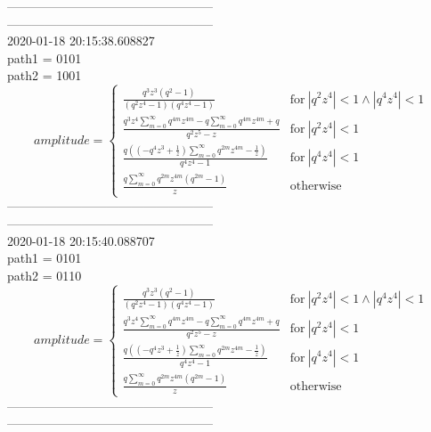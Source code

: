 \documentclass{jsreport}
\begin{document}
--------------------------------------------------\\
--------------------------------------------------\\
2020-01-18 20:15:38.608827\\
path1 = 0101\\
path2 = 1001\\
$$amplitude = \begin{cases} \frac{q^{3} z^{3} \left(q^{2} - 1\right)}{\left(q^{2} z^{4} - 1\right) \left(q^{4} z^{4} - 1\right)} & \text{for}\: \left|{q^{2} z^{4}}\right| < 1 \wedge \left|{q^{4} z^{4}}\right| < 1 \\\frac{q^{3} z^{4} \sum_{m=0}^{\infty} q^{4 m} z^{4 m} - q \sum_{m=0}^{\infty} q^{4 m} z^{4 m} + q}{q^{2} z^{5} - z} & \text{for}\: \left|{q^{2} z^{4}}\right| < 1 \\\frac{q \left(\left(- q^{4} z^{3} + \frac{1}{z}\right) \sum_{m=0}^{\infty} q^{2 m} z^{4 m} - \frac{1}{z}\right)}{q^{4} z^{4} - 1} & \text{for}\: \left|{q^{4} z^{4}}\right| < 1 \\\frac{q \sum_{m=0}^{\infty} q^{2 m} z^{4 m} \left(q^{2 m} - 1\right)}{z} & \text{otherwise} \end{cases}$$
--------------------------------------------------\\
--------------------------------------------------\\
2020-01-18 20:15:40.088707\\
path1 = 0101\\
path2 = 0110\\
$$amplitude = \begin{cases} \frac{q^{3} z^{3} \left(q^{2} - 1\right)}{\left(q^{2} z^{4} - 1\right) \left(q^{4} z^{4} - 1\right)} & \text{for}\: \left|{q^{2} z^{4}}\right| < 1 \wedge \left|{q^{4} z^{4}}\right| < 1 \\\frac{q^{3} z^{4} \sum_{m=0}^{\infty} q^{4 m} z^{4 m} - q \sum_{m=0}^{\infty} q^{4 m} z^{4 m} + q}{q^{2} z^{5} - z} & \text{for}\: \left|{q^{2} z^{4}}\right| < 1 \\\frac{q \left(\left(- q^{4} z^{3} + \frac{1}{z}\right) \sum_{m=0}^{\infty} q^{2 m} z^{4 m} - \frac{1}{z}\right)}{q^{4} z^{4} - 1} & \text{for}\: \left|{q^{4} z^{4}}\right| < 1 \\\frac{q \sum_{m=0}^{\infty} q^{2 m} z^{4 m} \left(q^{2 m} - 1\right)}{z} & \text{otherwise} \end{cases}$$
--------------------------------------------------\\
--------------------------------------------------\\
\end{document}
